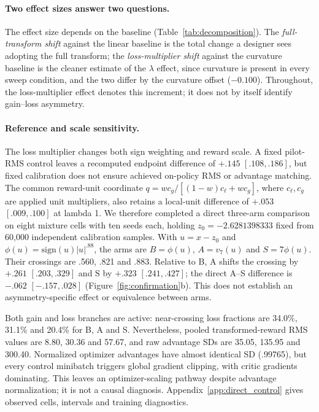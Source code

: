 \paragraph{Two effect sizes answer two questions.}
The effect size depends on the baseline (Table~\ref{tab:decomposition}). The \emph{full-transform shift}
against the linear baseline is the total change a designer sees adopting the full transform; the
\emph{loss-multiplier shift} against the curvature baseline is the cleaner estimate of the
$\lambda$ effect,
since curvature is present in every sweep condition, and the two differ by the curvature offset
($-0.100$). Throughout, the loss-multiplier effect denotes this increment; it does not by itself identify gain--loss asymmetry.

\paragraph{Reference and scale sensitivity.}
The loss multiplier changes both sign weighting and reward scale. A fixed pilot-RMS control leaves a recomputed endpoint difference of $+.145$ $[.108,.186]$, but fixed calibration does not ensure achieved on-policy RMS or advantage matching. The common reward-unit coordinate $q=wc_g/[(1-w)c_\ell+wc_g]$, where $c_\ell,c_g$ are applied unit multipliers, also retains a local-unit difference of $+.053$ $[.009,.100]$ at lambda 1. We therefore completed a direct three-arm comparison on eight mixture cells with ten seeds each, holding $z_0=-2.6281398333$ fixed from 60,000 independent calibration samples. With $u=x-z_0$ and $\phi(u)=\mathrm{sign}(u)|u|^{.88}$, the arms are $B=\phi(u)$, $A=v_7(u)$ and $S=7\phi(u)$. Their crossings are .560, .821 and .883. Relative to B, A shifts the crossing by $+.261$ $[.203,.329]$ and S by $+.323$ $[.241,.427]$; the direct A--S difference is $-.062$ $[-.157,.028]$ (Figure~\ref{fig:confirmation}b). This does not establish an asymmetry-specific effect or equivalence between arms.

Both gain and loss branches are active: near-crossing loss fractions are 34.0\%, 31.1\% and 20.4\% for B, A and S. Nevertheless, pooled transformed-reward RMS values are 8.80, 30.36 and 57.67, and raw advantage SDs are 35.05, 135.95 and 300.40. Normalized optimizer advantages have almost identical SD (.99765), but every control minibatch triggers global gradient clipping, with critic gradients dominating. This leaves an optimizer-scaling pathway despite advantage normalization; it is not a causal diagnosis. Appendix~\ref{app:direct_control} gives observed cells, intervals and training diagnostics.

